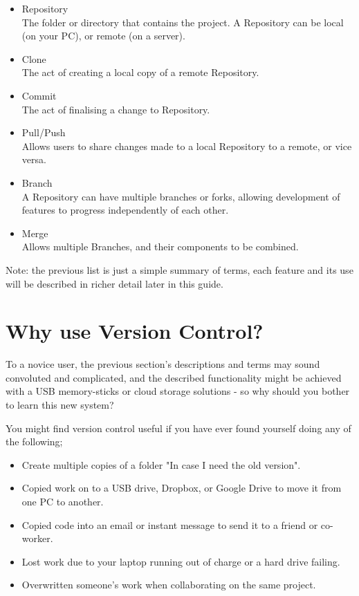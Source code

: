 \documentclass[11pt, a4paper, draft, titlepage]{article}
\begin{document}
\begin{itemize} 
\item Repository \\ The folder or directory that contains the
project.  A Repository can be local (on your PC), or remote (on a server).
\item Clone \\ The act of creating a local copy of a remote Repository.  
\item Commit \\ The act of finalising a change to Repository.  
\item Pull/Push \\ Allows users to share changes made to a local Repository to
a remote, or vice versa.  
\item Branch \\ A Repository can have multiple branches or forks,
allowing development of features to progress independently of each other.
\item Merge \\ Allows multiple Branches, and their components to be combined.
\end{itemize}

Note: the previous list is just a simple summary of terms, each feature and
its use will be described in richer detail later in this guide.


\section{Why use Version Control?} To a novice user, the previous section's
descriptions and terms may sound convoluted and complicated, and the described
functionality might be achieved with a USB memory-sticks or cloud storage
solutions - so why should you bother to learn this new system?

You might find version control useful if you have ever found yourself doing
any of the following; 
\begin{itemize}
\item Create multiple copies of a folder "In case I need the old version".
\item Copied work on to a USB drive, Dropbox, or Google Drive to move it from
one PC to another.
\item Copied code into an email or instant message to send it to a friend or
co-worker.
\item Lost work due to your laptop running out of charge or a hard drive
failing.
\item Overwritten someone's work when collaborating on the same project.
\end{itemize}
\end{document}
